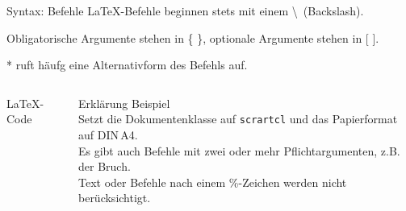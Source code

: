 \begin{frame}[fragile]{Syntax: Befehle}
  \LaTeX-Befehle beginnen stets mit einem \textbackslash\ (Backslash).

  Obligatorische Argumente stehen in \{ \}, optionale Argumente stehen in [ ].

  * ruft häufg eine Alternativform des Befehls auf.
  \begin{columns}[T]
    \begin{column}{0.53\textwidth}
      \begin{block}{\LaTeX-Code}
      \end{block}
    \end{column}
    \begin{column}{0.41\textwidth}
      \begin{block}{Erklärung}
        Beispiel \\
        Setzt die Dokumentenklasse auf \texttt{scrartcl} und das Papierformat auf DIN\,A4. \\
        Es gibt auch Befehle mit zwei oder mehr Pflichtargumenten, z.B. der Bruch. \\
        Text oder Befehle nach einem \%-Zeichen werden nicht berücksichtigt.
      \end{block}
    \end{column}
  \end{columns}
\end{frame}


